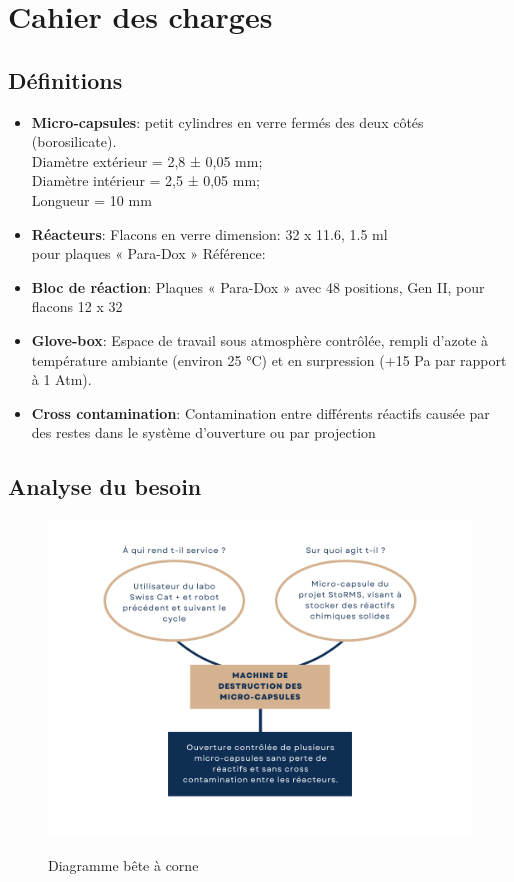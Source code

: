 \section{Cahier des charges}

\subsection{Définitions}

\begin{itemize}[label=\textbullet]
    \item \textbf{Micro-capsules}: petit cylindres en verre fermés des deux côtés (borosilicate). \\ 
    Diamètre extérieur = 2,8 ± 0,05 mm; \\
    Diamètre intérieur = 2,5 ± 0,05 mm; \\
    Longueur = 10 mm

    \item \textbf{Réacteurs}: Flacons en verre dimension: 32 x 11.6, 1.5 ml \\ pour plaques « Para-Dox »
    Référence: \cite{ref_vial}

    \item \textbf{Bloc de réaction}: Plaques « Para-Dox » avec 48 positions, Gen II, pour flacons 12 x 32
    
    \item \textbf{Glove-box}: Espace de travail sous atmosphère contrôlée, rempli d'azote à température 
    ambiante (environ 25 °C) et en surpression (+15 Pa par rapport à 1 Atm).
    \item \textbf{Cross contamination}: Contamination entre différents réactifs 
    causée par des restes dans le système d'ouverture ou par projection
\end{itemize}

\subsection{Analyse du besoin}

\begin{figure}[H]
    \centering
    \includegraphics[width=15cm]{Images/Illustrations/CDH/Bete a corne.png}
    \label{fig:beteacorne}
    \caption{Diagramme bête à corne}
\end{figure}

